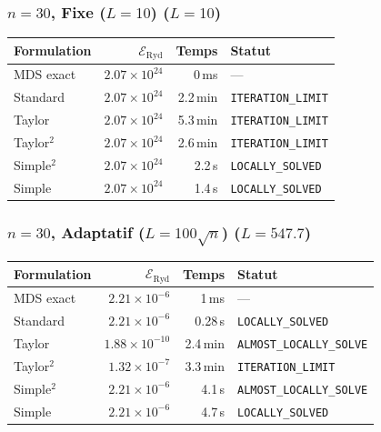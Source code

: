 \subsubsection{$n=30$, Fixe ($L{=}10$) ($L=10$)}
\begin{longtable}{@{}lrrl@{}}
  \toprule
  Formulation & $\mathcal{E}_{\mathrm{Ryd}}$ & Temps & Statut \\
  \midrule
  \endhead
  MDS exact & $2.07\times10^{24}$ & 0\,ms & --- \\
  Standard & $2.07\times10^{24}$ & 2.2\,min & \texttt{ITERATION\_LIMIT} \\
  Taylor & $2.07\times10^{24}$ & 5.3\,min & \texttt{ITERATION\_LIMIT} \\
  Taylor$^2$ & $2.07\times10^{24}$ & 2.6\,min & \texttt{ITERATION\_LIMIT} \\
  Simple$^2$ & $2.07\times10^{24}$ & 2.2\,s & \texttt{LOCALLY\_SOLVED} \\
  Simple & $2.07\times10^{24}$ & 1.4\,s & \texttt{LOCALLY\_SOLVED} \\
  \bottomrule
\end{longtable}

\subsubsection{$n=30$, Adaptatif ($L{=}100\sqrt{n}$) ($L=547.7$)}
\begin{longtable}{@{}lrrl@{}}
  \toprule
  Formulation & $\mathcal{E}_{\mathrm{Ryd}}$ & Temps & Statut \\
  \midrule
  \endhead
  MDS exact & $2.21\times10^{-6}$ & 1\,ms & --- \\
  Standard & $2.21\times10^{-6}$ & 0.28\,s & \texttt{LOCALLY\_SOLVED} \\
  Taylor & $1.88\times10^{-10}$ & 2.4\,min & \texttt{ALMOST\_LOCALLY\_SOLVE} \\
  Taylor$^2$ & $1.32\times10^{-7}$ & 3.3\,min & \texttt{ITERATION\_LIMIT} \\
  Simple$^2$ & $2.21\times10^{-6}$ & 4.1\,s & \texttt{ALMOST\_LOCALLY\_SOLVE} \\
  Simple & $2.21\times10^{-6}$ & 4.7\,s & \texttt{LOCALLY\_SOLVED} \\
  \bottomrule
\end{longtable}

